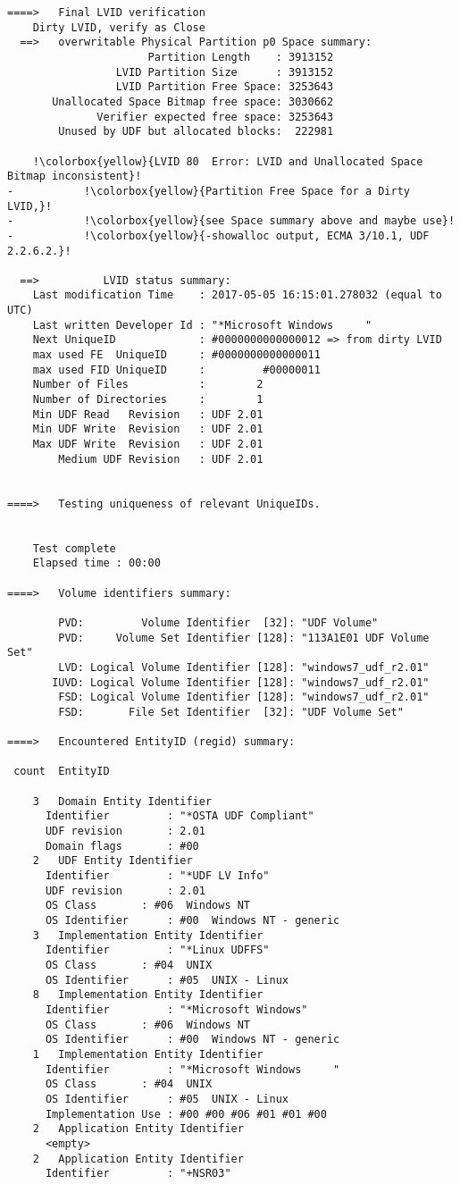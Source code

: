 \begin{lstlisting}
====>   Final LVID verification
    Dirty LVID, verify as Close
  ==>   overwritable Physical Partition p0 Space summary:
                      Partition Length    : 3913152
                 LVID Partition Size      : 3913152
                 LVID Partition Free Space: 3253643
       Unallocated Space Bitmap free space: 3030662
              Verifier expected free space: 3253643
        Unused by UDF but allocated blocks:  222981

    !\colorbox{yellow}{LVID 80  Error: LVID and Unallocated Space Bitmap inconsistent}!
-           !\colorbox{yellow}{Partition Free Space for a Dirty LVID,}!
-           !\colorbox{yellow}{see Space summary above and maybe use}!
-           !\colorbox{yellow}{-showalloc output, ECMA 3/10.1, UDF 2.2.6.2.}!

  ==>          LVID status summary:
    Last modification Time    : 2017-05-05 16:15:01.278032 (equal to UTC)
    Last written Developer Id : "*Microsoft Windows     "
    Next UniqueID             : #0000000000000012 => from dirty LVID
    max used FE  UniqueID     : #0000000000000011
    max used FID UniqueID     :         #00000011
    Number of Files           :        2
    Number of Directories     :        1
    Min UDF Read   Revision   : UDF 2.01
    Min UDF Write  Revision   : UDF 2.01
    Max UDF Write  Revision   : UDF 2.01
        Medium UDF Revision   : UDF 2.01


====>   Testing uniqueness of relevant UniqueIDs.


    Test complete
    Elapsed time : 00:00

====>   Volume identifiers summary:

        PVD:         Volume Identifier  [32]: "UDF Volume"
        PVD:     Volume Set Identifier [128]: "113A1E01 UDF Volume Set"
        LVD: Logical Volume Identifier [128]: "windows7_udf_r2.01"
       IUVD: Logical Volume Identifier [128]: "windows7_udf_r2.01"
        FSD: Logical Volume Identifier [128]: "windows7_udf_r2.01"
        FSD:       File Set Identifier  [32]: "UDF Volume Set"

====>   Encountered EntityID (regid) summary:

 count  EntityID

    3   Domain Entity Identifier
      Identifier         : "*OSTA UDF Compliant"
      UDF revision       : 2.01
      Domain flags       : #00
    2   UDF Entity Identifier
      Identifier         : "*UDF LV Info"
      UDF revision       : 2.01
      OS Class       : #06  Windows NT
      OS Identifier      : #00  Windows NT - generic
    3   Implementation Entity Identifier
      Identifier         : "*Linux UDFFS"
      OS Class       : #04  UNIX
      OS Identifier      : #05  UNIX - Linux
    8   Implementation Entity Identifier
      Identifier         : "*Microsoft Windows"
      OS Class       : #06  Windows NT
      OS Identifier      : #00  Windows NT - generic
    1   Implementation Entity Identifier
      Identifier         : "*Microsoft Windows     "
      OS Class       : #04  UNIX
      OS Identifier      : #05  UNIX - Linux
      Implementation Use : #00 #00 #06 #01 #01 #00
    2   Application Entity Identifier
      <empty>
    2   Application Entity Identifier
      Identifier         : "+NSR03"


\end{lstlisting}
